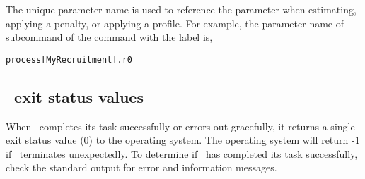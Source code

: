 The unique parameter name is used to reference the parameter when estimating, applying a penalty, or applying a profile. For example, the parameter name of subcommand  of the command  with the label  is,

\texttt{process[MyRecruitment].r0}

\subsection{\SPM\ exit status values}

When \SPM\ completes its task successfully or errors out gracefully, it returns a single exit status value (0) to the operating system. The operating system will return -1 if \SPM\ terminates unexpectedly. To determine if \SPM\ has completed its task successfully, check the standard output for error and information messages.
